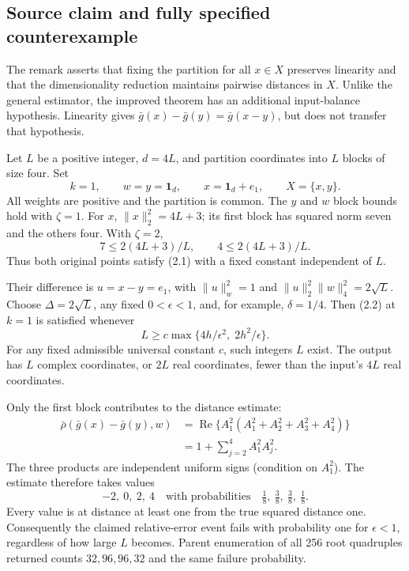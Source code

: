\documentclass[10pt]{article}
\begin{document}
\subsection*{Source claim and fully specified counterexample}
The remark asserts that fixing the partition for all \(x\in X\) preserves linearity and that the dimensionality reduction maintains pairwise distances in \(X\). Unlike the general estimator, the improved theorem has an additional input-balance hypothesis. Linearity gives \(\bar g(x)-\bar g(y)=\bar g(x-y)\), but does not transfer that hypothesis.\par
Let \(L\) be a positive integer, \(d=4L\), and partition coordinates into \(L\) blocks of size four. Set \[k=1,\qquad w=y=\mathbf1_d,\qquad x=\mathbf1_d+e_1,
 \qquad X=\{x,y\}.\] All weights are positive and the partition is common. The \(y\) and \(w\) block bounds hold with \(\zeta=1\). For \(x\), \(\|x\|_2^2=4L+3\); its first block has squared norm seven and the others four. With \(\zeta=2\), \[7\le2(4L+3)/L,\qquad 4\le2(4L+3)/L .\] Thus both original points satisfy (2.1) with a fixed constant independent of \(L\).\par
Their difference is \(u=x-y=e_1\), with \(\|u\|_w^2=1\) and \(\|u\|_2^2\|w\|_4^2=2\sqrt L\). Choose \(\Delta=2\sqrt L\), any fixed \(0<\epsilon<1\), and, for example, \(\delta=1/4\). Then (2.2) at \(k=1\) is satisfied whenever \[L\ge c\max\{4h/\epsilon^2,\;2h^2/\epsilon\}.\] For any fixed admissible universal constant \(c\), such integers \(L\) exist. The output has \(L\) complex coordinates, or \(2L\) real coordinates, fewer than the input’s \(4L\) real coordinates.\par
Only the first block contributes to the distance estimate: \[\begin{aligned}
 \bar\rho(\bar g(x)-\bar g(y),w)
 &=\operatorname{Re}\{A_1^2(A_1^2+A_2^2+A_3^2+A_4^2)\}\\
 &=1+\sum_{j=2}^4 A_1^2A_j^2 .\end{aligned}\] The three products are independent uniform signs (condition on \(A_1^2\)). The estimate therefore takes values \[-2,\ 0,\ 2,\ 4
 \quad\text{with probabilities}\quad
 \tfrac18,\ \tfrac38,\ \tfrac38,\ \tfrac18 .\] Every value is at distance at least one from the true squared distance one. Consequently the claimed relative-error event fails with probability one for \(\epsilon<1\), regardless of how large \(L\) becomes. Parent enumeration of all 256 root quadruples returned counts \(32,96,96,32\) and the same failure probability.\par
\end{document}
